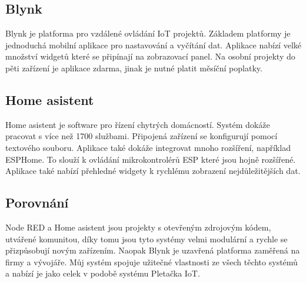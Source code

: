 \subsection{Blynk}
Blynk je platforma pro vzdálené ovládání IoT projektů.
Základem platformy je jednoduchá mobilní aplikace pro nastavování a vyčítání dat.
Aplikace nabízí velké množství widgetů které se připínají na zobrazovací panel.
Na osobní projekty do pěti zařízení je aplikace zdarma, jinak je nutné platit měsíční poplatky.


\subsection{Home asistent}
Home asistent je software pro řízení chytrých domácností. 
Systém dokáže pracovat s více než 1700 službami.
Připojená zařízení se konfigurují pomocí textového souboru.
Aplikace také dokáže integrovat mnoho rozšíření, například ESPHome.
To slouží k ovládání mikrokontrolérů ESP které jsou hojně rozšířené.
Aplikace také nabízí přehledné widgety k rychlému zobrazení nejdůležitějších dat. 


\subsection{Porovnání}
Node RED a Home asistent jsou projekty s otevřeným zdrojovým kódem, utvářené komunitou, díky tomu jsou tyto systémy velmi modulární a rychle se přizpůsobují novým zařízením.
Naopak Blynk je uzavřená platforma zaměřená na firmy a vývojáře.
Můj systém spojuje užitečné vlastnosti ze všech těchto systémů a nabízí je jako celek v podobě systému Pletačka IoT.